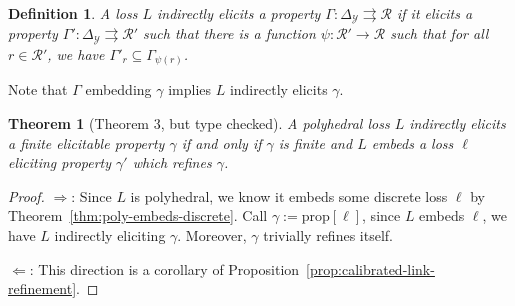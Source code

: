 \documentclass[12pt]{article}
\newcommand{\prop}[1]{\mathrm{prop}[#1]}
\newcommand{\simplex}{\Delta_\Y}
\newcommand{\R}{\mathcal{R}}
\newcommand{\Y}{\mathcal{Y}}
\newcommand{\toto}{\rightrightarrows}
\newtheorem{theorem}{Theorem}
\newtheorem{definition}{Definition}
\begin{document}
\begin{definition}\label{def:indirectly-elicits}
	A loss $L$ indirectly elicits a property $\Gamma:\simplex \toto \R$ if it elicits a property $\Gamma': \simplex \toto \R'$ such that there is a function $\psi:\R' \to \R$ such that for all $r \in \R'$, we have $\Gamma'_r \subseteq \Gamma_{\psi(r)}$.
\end{definition}
Note that $\Gamma$ embedding $\gamma$ implies $L$ indirectly elicits $\gamma$.

\begin{theorem}[Theorem 3, but type checked]
	A polyhedral loss $L$ indirectly elicits a finite elicitable property $\gamma$ if and only if $\gamma$ is finite and $L$ embeds a loss $\ell$ eliciting property $\gamma'$ which refines $\gamma$.
\end{theorem}
\begin{proof}
	$\Rightarrow$: 
	Since $L$ is polyhedral, we know it embeds some discrete loss $\ell$ by Theorem~\ref{thm:poly-embeds-discrete}.
	Call $\gamma := \prop{\ell}$, since $L$ embeds $\ell$, we have $L$ indirectly eliciting $\gamma$.
	Moreover, $\gamma$ trivially refines itself.
	
	$\Leftarrow$:
	This direction is a corollary of Proposition~\ref{prop:calibrated-link-refinement}.
	
\end{proof}
\end{document}
